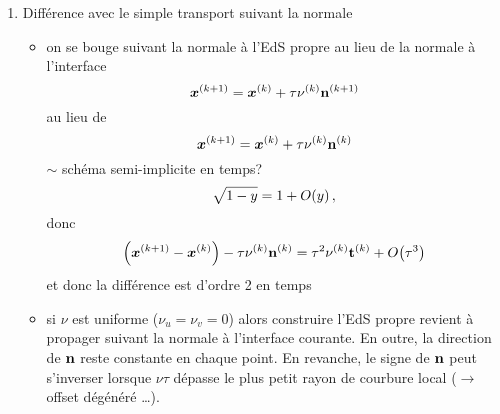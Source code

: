 \begin{enumerate}
	\item Différence avec le simple transport suivant la normale
	\begin{itemize}
		\item on se bouge suivant la normale à l'EdS propre au lieu de la normale à l'interface
		\[
			\bm{x}^{(k+1)} = \bm{x}^{(k)} + \tau \nu^{(k)} \mathbf{n}^{(k+1)}
		\]
		au lieu de 
		\[
			\bm{x}^{(k+1)} = \bm{x}^{(k)} + \tau \nu^{(k)} \mathbf{n}^{(k)}
		\]
		$\sim$ schéma semi-implicite en temps?
		\[
			\sqrt{1 - y} = 1 + O\!\left( {y} \right),
		\]
		donc
		\[
			\left( \bm{x}^{(k+1)} - \bm{x}^{(k)} \right) - \tau \nu^{(k)} \mathbf{n}^{(k)} = \tau^2 \nu^{(k)} \mathbf{t}^{(k)} + O\!\left( {\tau^3} \right)
		\]
		et donc la différence est d'ordre 2 en temps
		\item si $\nu$ est uniforme (\ie $\nu_u = \nu_v = 0$) alors construire l'EdS propre revient à propager suivant la normale à l'interface courante. 
		En outre, la direction de $\mathbf{n}$ reste constante en chaque point. 
		En revanche, le signe de $\mathbf{n}$ peut s'inverser lorsque $\nu \tau$ dépasse le plus petit rayon de courbure local ($\to$ offset dégénéré \ldots).
	\end{itemize}
\end{enumerate}

